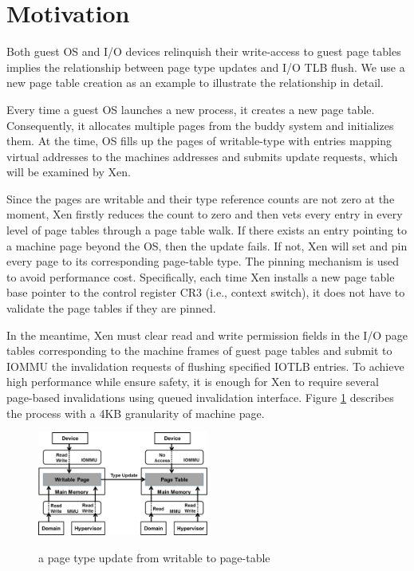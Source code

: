 \section{Motivation}

Both guest OS and I/O devices relinquish their write-access to guest page tables implies the relationship between page type updates and I/O TLB flush. We use a new page table creation as an example to illustrate the relationship in detail.

Every time a guest OS launches a new process, it creates a new page table. Consequently, it allocates multiple pages from the buddy system and initializes them. At the time, OS fills up the pages of writable-type with entries mapping virtual addresses to the machines addresses and submits update requests, which will be examined by Xen.

Since the pages are writable and their type reference counts are not zero at the moment, Xen firstly reduces the count to zero and then vets every entry in every level of page tables through a page table walk. If there exists an entry pointing to a machine page beyond the OS, then the update fails. If not, Xen will set and pin every page to its corresponding page-table type. The pinning mechanism is used to avoid performance cost. Specifically, each time Xen installs a new page table base pointer to the control register CR3 (i.e., context switch), it does not have to validate the page tables if they are pinned.

In the meantime, Xen must clear read and write permission fields in the I/O page tables corresponding to the machine frames of guest page tables and submit to IOMMU the invalidation requests of flushing specified IOTLB entries. To achieve high performance while ensure safety, it is enough for Xen to require several page-based invalidations using queued invalidation interface. Figure \ref{fig:wr2pt} describes the process with a 4KB granularity of machine page.

\begin{figure}[ht]
\centering
\includegraphics[width=0.5\textwidth]{image/translation/wr2pt.png} \\
\caption{a page type update from writable to page-table}
\label{fig:wr2pt}
\end{figure}

